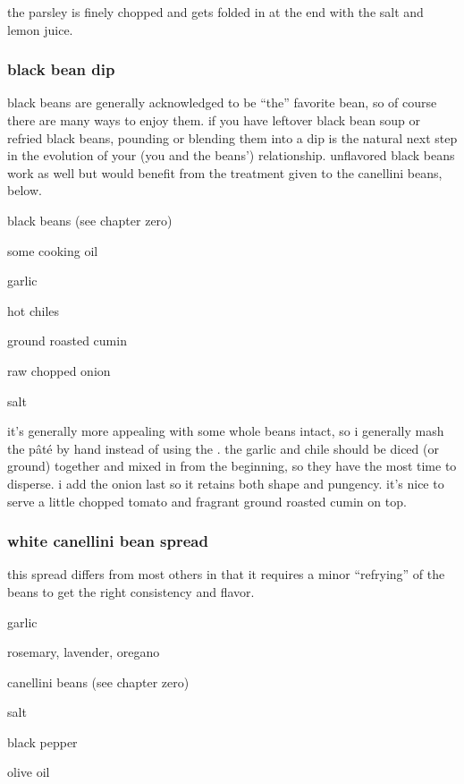 the parsley is finely chopped and gets folded in at the end with the
salt and lemon juice.

\subsubsection{black bean dip}

black beans are generally acknowledged to be ``the'' favorite
bean, so of course there are many ways to enjoy them. if you have
leftover black bean soup or refried black beans, pounding or blending
them into a dip is the natural next step in the evolution of your (you
and the beans') relationship. unflavored black beans work as well
but would benefit from the treatment given to the canellini beans,
below.

\begin{ingredients}
  \item black beans (see chapter zero)
  \item some cooking oil
  \item garlic
  \item hot chiles
  \item ground roasted cumin
  \item raw chopped onion
  \item salt
\end{ingredients}

it's generally more appealing with some whole beans intact, so i
generally mash the p\^{a}t\'{e} by hand instead of using the . the
garlic and chile should be diced (or ground) together and mixed in
from the beginning, so they have the most time to disperse. i add the
onion last so it retains both shape and pungency. it's nice to
serve a little chopped tomato and fragrant ground roasted cumin on
top.

\subsubsection{white canellini bean spread }

this spread differs from most others in that it requires a minor
``refrying'' of the beans to get the right consistency and flavor.

\begin{ingredients}
  \item garlic
  \item rosemary, lavender, oregano
  \item canellini beans (see chapter zero)
  \item salt
  \item black pepper
  \item olive oil
\end{ingredients}

